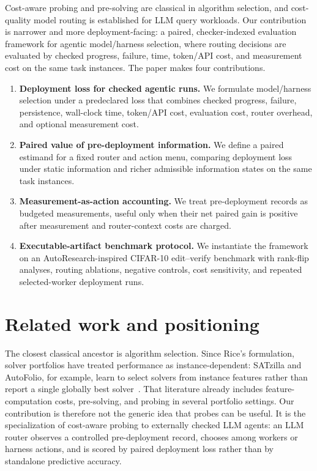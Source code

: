 \documentclass{article}
\begin{document}
Cost-aware probing and pre-solving are classical in algorithm selection, and cost-quality model routing is established for LLM query workloads.
Our contribution is narrower and more deployment-facing: a paired, checker-indexed evaluation framework for agentic model/harness selection, where routing decisions are evaluated by checked progress, failure, time, token/API cost, and measurement cost on the same task instances.
The paper makes four contributions.
\begin{enumerate}[leftmargin=1.35em,itemsep=0.2em]
  \item \textbf{Deployment loss for checked agentic runs.} We formulate model/harness selection under a predeclared loss that combines checked progress, failure, persistence, wall-clock time, token/API cost, evaluation cost, router overhead, and optional measurement cost.
  \item \textbf{Paired value of pre-deployment information.} We define a paired estimand for a fixed router and action menu, comparing deployment loss under static information and richer admissible information states on the same task instances.
  \item \textbf{Measurement-as-action accounting.} We treat pre-deployment records as budgeted measurements, useful only when their net paired gain is positive after measurement and router-context costs are charged.
  \item \textbf{Executable-artifact benchmark protocol.} We instantiate the framework on an AutoResearch-inspired CIFAR-10 edit--verify benchmark with rank-flip analyses, routing ablations, negative controls, cost sensitivity, and repeated selected-worker deployment runs.
\end{enumerate}

\section{Related work and positioning}
\label{sec:related}

The closest classical ancestor is algorithm selection.
Since Rice's formulation, solver portfolios have treated performance as instance-dependent: SATzilla and AutoFolio, for example, learn to select solvers from instance features rather than report a single globally best solver~\citep{rice1976algorithm, xu2012satzilla, lindauer2015autofolio, kotthoff2016algorithm}.
That literature already includes feature-computation costs, pre-solving, and probing in several portfolio settings.
Our contribution is therefore not the generic idea that probes can be useful.
It is the specialization of cost-aware probing to externally checked LLM agents: an LLM router observes a controlled pre-deployment record, chooses among workers or harness actions, and is scored by paired deployment loss rather than by standalone predictive accuracy.
\end{document}
